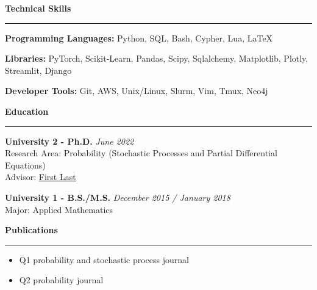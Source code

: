 \documentclass[11pt]{article}
\begin{document}
\vspace{.3em}
\textbf{\Large Technical Skills}
\vspace{.3em}
\hrule
\vspace{.3em}

\textbf{Programming Languages:}
Python, SQL, Bash, Cypher, Lua, \LaTeX

\textbf{Libraries:} 
PyTorch, Scikit-Learn, Pandas, Scipy, Sqlalchemy, Matplotlib, Plotly, Streamlit, Django
 

\textbf{Developer Tools:} Git, AWS, Unix/Linux, Slurm, Vim, Tmux, Neo4j


\vspace{.3em}
\textbf{\Large Education}
\vspace{.3em}
\hrule
\vspace{.3em}

\textbf{University 2 - Ph.D.} \hfill \textit{June 2022} \\
Research Area: Probability (Stochastic Processes and Partial Differential Equations) \\
Advisor: \href{http://}{First Last}

\textbf{University 1 - B.S./M.S.} 
\hfill \textit{December 2015 / January 2018} \\
Major: Applied Mathematics

\vspace{.3em}
\textbf{\Large Publications}
\vspace{.3em}
\hrule
\vspace{.3em}

\begin{itemize}[leftmargin=*]
  \item[1:] Q1 probability and stochastic process journal

  \item[2:] Q2 probability journal

\end{itemize}
\end{document}
